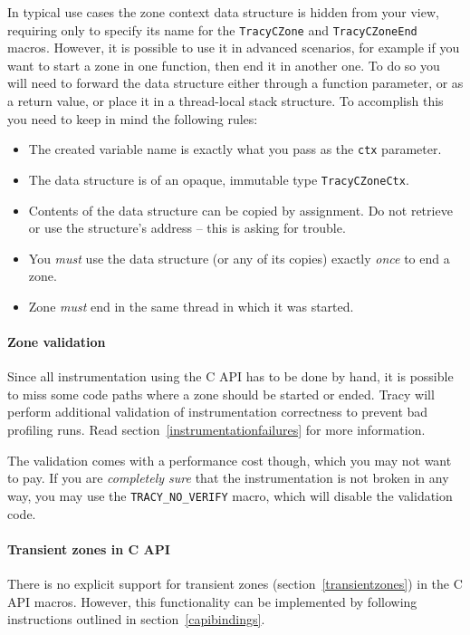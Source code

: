 \documentclass[hidelinks,titlepage,a4paper]{article}
\begin{document}
In typical use cases the zone context data structure is hidden from your view, requiring only to specify its name for the \texttt{TracyCZone} and \texttt{TracyCZoneEnd} macros. However, it is possible to use it in advanced scenarios, for example if you want to start a zone in one function, then end it in another one. To do so you will need to forward the data structure either through a function parameter, or as a return value, or place it in a thread-local stack structure. To accomplish this you need to keep in mind the following rules:

\begin{itemize}
\item The created variable name is exactly what you pass as the \texttt{ctx} parameter.
\item The data structure is of an opaque, immutable type \texttt{TracyCZoneCtx}.
\item Contents of the data structure can be copied by assignment. Do not retrieve or use the structure's address -- this is asking for trouble.
\item You \emph{must} use the data structure (or any of its copies) exactly \emph{once} to end a zone.
\item Zone \emph{must} end in the same thread in which it was started.
\end{itemize}

\paragraph{Zone validation}

Since all instrumentation using the C API has to be done by hand, it is possible to miss some code paths where a zone should be started or ended. Tracy will perform additional validation of instrumentation correctness to prevent bad profiling runs. Read section~\ref{instrumentationfailures} for more information.

The validation comes with a performance cost though, which you may not want to pay. If you are \emph{completely sure} that the instrumentation is not broken in any way, you may use the \texttt{TRACY\_NO\_VERIFY} macro, which will disable the validation code.

\paragraph{Transient zones in C API}

There is no explicit support for transient zones (section~\ref{transientzones}) in the C API macros. However, this functionality can be implemented by following instructions outlined in section~\ref{capibindings}.
\end{document}
